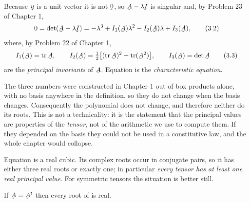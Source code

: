 Because $\bu$ is a unit vector it is not $\bze$, so $\bA-\lambda\I$ is
singular and, by Problem 23 of Chapter 1,
\begin{equation}
   0=\det(\bA-\lambda\I)=-\lambda^{3}+I_{1}(\bA)\lambda^{2}
     -I_{2}(\bA)\lambda+I_{3}(\bA),
   \tag{3.2}\label{eq:3.2}
\end{equation}
where, by Problem 22 of Chapter 1,
\begin{equation}
   I_{1}(\bA)=\tr\bA,\qquad
   I_{2}(\bA)=\tfrac12\big[(\tr\bA)^{2}-\tr(\bA^{2})\big],\qquad
   I_{3}(\bA)=\det\bA
   \tag{3.3}\label{eq:3.3}
\end{equation}
are the \emph{principal invariants} of $\bA$. Equation  is the
\emph{characteristic equation}.

\begin{remark}
\label{rem:invmeans}
The three numbers  were constructed in Chapter 1 out of box products
alone, with no basis anywhere in the definition, so they do not change when
the basis changes. Consequently the polynomial  does not change, and
therefore neither do its roots. This is not a technicality: it is the
statement that the principal values are properties of the \emph{tensor},
not of the arithmetic we use to compute them. If they depended on the
basis they could not be used in a constitutive law, and the whole chapter
would collapse.
\end{remark}

Equation  is a real cubic. Its complex roots occur in conjugate
pairs, so it has either three real roots or exactly one; in particular
\emph{every tensor has at least one real principal value}. For symmetric
tensors the situation is better still.

\begin{theorem}[Reality]\label{thm:real}
If $\bA=\bA^{t}$ then every root of  is real.
\end{theorem}


